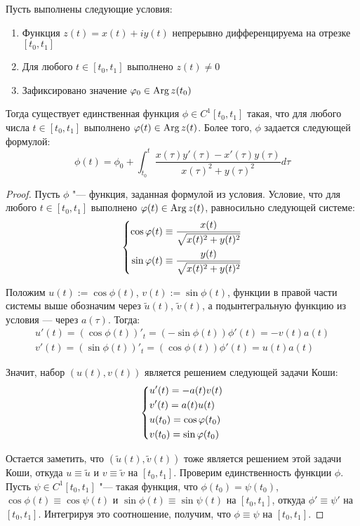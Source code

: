 \begin{proposition}
	Пусть выполнены следующие условия:
	\begin{enumerate}
		\item Функция $z(t) = x(t) + iy(t)$ непрерывно дифференцируема на отрезке $[t_0, t_1]$
		\item Для любого $t \in [t_0, t_1]$ выполнено $z(t) \ne 0$
		\item Зафиксировано значение $\varphi_0 \in \operatorname{Arg}{z(t_0)}$
	\end{enumerate}

	Тогда существует единственная функция $\phi \in C^1[t_0, t_1]$ такая, что для любого числа $t \in [t_0, t_1]$ выполнено $\varphi(t) \in \operatorname{Arg} z(t)$. Более того, $\phi$ задается следующей формулой:
	\[\phi(t) = \phi_0 + \int_{t_0}^t\frac{x(\tau)y'(\tau) - x'(\tau)y(\tau)}{x(\tau)^2 + y(\tau)^2}d\tau\]
\end{proposition}

\begin{proof}
	Пусть $\phi$ "--- функция, заданная формулой из условия. Условие, что для любого $t \in [t_0, t_1]$ выполнено $\varphi(t) \in \operatorname{Arg} z(t)$, равносильно следующей системе:
	\[\left\{\begin{aligned}
		\cos\varphi(t) \equiv \frac{x(t)}{\sqrt{x(t)^2 + y(t)^2}} \\
		\sin\varphi(t) \equiv \frac{y(t)}{\sqrt{x(t)^2 + y(t)^2}}
	\end{aligned}\right.\]
	
	Положим $u(t) := \cos\phi(t)$, $v(t) := \sin\phi(t)$, функции в правой части системы выше обозначим через $\widetilde u(t)$, $\widetilde v(t)$, а подынтегральную функцию из условия --- через $a(\tau)$. Тогда:
	\begin{gather*}
		u'(t) = (\cos\phi(t))'_t = (-\sin\phi(t))\phi'(t) = -v(t)a(t)\\
		v'(t) = (\sin\phi(t))'_t = (\cos\phi(t))\phi'(t) = u(t)a(t)
	\end{gather*}
	
	Значит, набор $(u(t), v(t))$ является решением следующей задачи Коши:
	\[\left\{\begin{aligned}
	&u'(t) = -a(t)v(t)\\
	&v'(t) = a(t)u(t)\\
	&u(t_0) = \cos\varphi(t_0)\\
	&v(t_0) = \sin\varphi(t_0)\end{aligned}\right.\]
	
	Остается заметить, что $(\widetilde u(t), \widetilde v(t))$ тоже является решением этой задачи Коши, откуда $u \equiv \widetilde u$ и $v \equiv \widetilde v$ на $[t_0, t_1]$. Проверим единственность функции $\phi$. Пусть $\psi \in C^1[t_0, t_1]$ "--- такая функция, что $\phi(t_0) = \psi(t_0)$, $\cos\phi(t) \equiv \cos\psi(t)$ и $\sin\phi(t) \equiv \sin\psi(t)$ на $[t_0, t_1]$, откуда $\phi' \equiv \psi'$ на $[t_0, t_1]$. Интегрируя это соотношение, получим, что $\phi \equiv \psi$ на $[t_0, t_1]$.
\end{proof}

